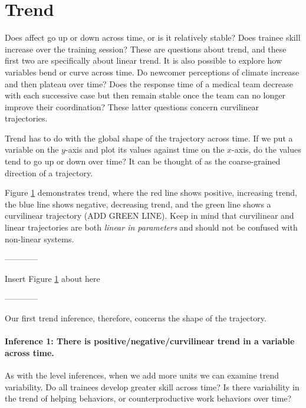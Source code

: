 \documentclass[english,,man]{apa6}
\let\oldparagraph\paragraph
\renewcommand{\paragraph}[1]{\oldparagraph{#1}\mbox{}}
\theoremstyle{definition}
\theoremstyle{definition}
\theoremstyle{definition}
\theoremstyle{remark}
\begin{document}
\hypertarget{trend}{%
\section{Trend}\label{trend}}

Does affect go up or down across time, or is it relatively stable? Does
trainee skill increase over the training session? These are questions
about trend, and these first two are specifically about linear trend. It
is also possible to explore how variables bend or curve across time. Do
newcomer perceptions of climate increase and then plateau over time?
Does the response time of a medical team decrease with each successive
case but then remain stable once the team can no longer improve their
coordination? These latter questions concern curvilinear trajectories.

Trend has to do with the global shape of the trajectory across time. If
we put a variable on the \(y\)-axis and plot its values against time on
the \(x\)-axis, do the values tend to go up or down over time? It can be
thought of as the coarse-grained direction of a trajectory.

Figure \ref{trend} demonstrates trend, where the red line shows
positive, increasing trend, the blue line shows negative, decreasing
trend, and the green line shows a curvilinear trajectory (ADD GREEN
LINE). Keep in mind that curvilinear and linear trajectories are both
\emph{linear in parameters} and should not be confused with non-linear
systems.

\begin{center}

------------

Insert Figure \ref{trend} about here

------------

\end{center}

Our first trend inference, therefore, concerns the shape of the
trajectory.

\hypertarget{inference-1-there-is-positivenegativecurvilinear-trend-in-a-variable-across-time.}{%
\paragraph{Inference 1: There is positive/negative/curvilinear trend in
a variable across
time.}\label{inference-1-there-is-positivenegativecurvilinear-trend-in-a-variable-across-time.}}

As with the level inferences, when we add more units we can examine
trend variability. Do all trainees develop greater skill across time? Is
there variability in the trend of helping behaviors, or
counterproductive work behaviors over time?
\end{document}
